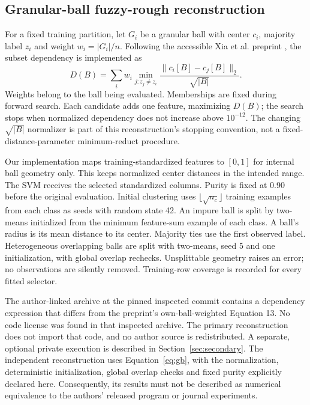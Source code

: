 \documentclass[11pt,a4paper]{article}
\begin{document}
\subsection{Granular-ball fuzzy-rough reconstruction}
For a fixed training partition, let $G_i$ be a granular ball with center $c_i$, majority label $z_i$ and weight $w_i=|G_i|/n$. Following the accessible Xia et al. preprint \cite{xia}, the subset dependency is implemented as
\begin{equation}\label{eq:gb}
 D(B)=\sum_i w_i\min_{j:z_j\ne z_i}\frac{\|c_i[B]-c_j[B]\|_2}{\sqrt{|B|}}.
\end{equation}
Weights belong to the ball being evaluated. Memberships are fixed during forward search. Each candidate adds one feature, maximizing $D(B)$; the search stops when normalized dependency does not increase above $10^{-12}$. The changing $\sqrt{|B|}$ normalizer is part of this reconstruction's stopping convention, not a fixed-distance-parameter minimum-reduct procedure.

Our implementation maps training-standardized features to $[0,1]$ for internal ball geometry only. This keeps normalized center distances in the intended range. The SVM receives the selected standardized columns. Purity is fixed at 0.90 before the original evaluation. Initial clustering uses $\lfloor\sqrt{n_c}\rfloor$ training examples from each class as seeds with random state 42. An impure ball is split by two-means initialized from the minimum feature-sum example of each class. A ball's radius is its mean distance to its center. Majority ties use the first observed label. Heterogeneous overlapping balls are split with two-means, seed 5 and one initialization, with global overlap rechecks. Unsplittable geometry raises an error; no observations are silently removed. Training-row coverage is recorded for every fitted selector.

The author-linked archive \cite{authorcode} at the pinned inspected commit contains a dependency expression that differs from the preprint's own-ball-weighted Equation 13. No code license was found in that inspected archive. The primary reconstruction does not import that code, and no author source is redistributed. A separate, optional private execution is described in Section~\ref{sec:secondary}. The independent reconstruction uses Equation~\ref{eq:gb}, with the normalization, deterministic initialization, global overlap checks and fixed purity explicitly declared here. Consequently, its results must not be described as numerical equivalence to the authors' released program or journal experiments.
\end{document}
